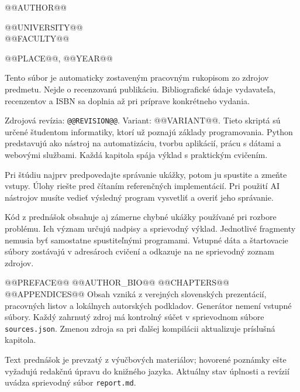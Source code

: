 \documentclass[oneside,openany,titlepage,numbers=noenddot,headinclude,
  footinclude=true,cleardoublepage=empty,BCOR=0mm,paper=a4,fontsize=11pt]{scrbook}
\begin{document}
\frenchspacing
\raggedbottom
\frontmatter
\pagestyle{plain}

\thispagestyle{empty}
\noindent{}\par
@@AUTHOR@@\par
@@UNIVERSITY@@\\@@FACULTY@@\par
@@PLACE@@, @@YEAR@@\par
\vfill
Tento súbor je automaticky zostaveným pracovným rukopisom zo zdrojov predmetu.
Nejde o recenzovanú publikáciu. Bibliografické údaje vydavateľa, recenzentov a ISBN
sa doplnia až pri príprave konkrétneho vydania.
\par\smallskip
Zdrojová revízia: \texttt{@@REVISION@@}. Variant: @@VARIANT@@.
\cleardoublepage
\pagestyle{scrheadings}
Tieto skriptá sú určené študentom informatiky, ktorí už poznajú základy programovania.
Python predstavujú ako nástroj na automatizáciu, tvorbu aplikácií, prácu s dátami
a webovými službami. Každá kapitola spája výklad s praktickým cvičením.
\par
Pri štúdiu najprv predpovedajte správanie ukážky, potom ju spustite a zmeňte vstupy.
Úlohy riešte pred čítaním referenčných implementácií. Pri použití AI nástrojov
musíte vedieť výsledný program vysvetliť a overiť jeho správanie.
\par
Kód z prednášok obsahuje aj zámerne chybné ukážky používané pri rozbore problému.
Ich význam určujú nadpisy a sprievodný výklad. Jednotlivé fragmenty nemusia byť
samostatne spustiteľnými programami. Vstupné dáta a štartovacie súbory zostávajú
v adresároch cvičení a odkazuje na ne sprievodný zoznam zdrojov.
\par
@@PREFACE@@
\cleardoublepage
@@AUTHOR_BIO@@
\tableofcontents
\mainmatter
@@CHAPTERS@@
\appendix
@@APPENDICES@@
\backmatter
\nocite{*}
\printbibliography[heading=bibintoc,title={Literatúra a dokumentácia}]
Obsah vzniká z verejných slovenských prezentácií, pracovných listov a lokálnych
autorských podkladov. Generátor nemení vstupné súbory. Každý zahrnutý zdroj má
kontrolný súčet v sprievodnom súbore \texttt{sources.json}. Zmenou zdroja sa pri
ďalšej kompilácii aktualizuje príslušná kapitola.
\par
Text prednášok je prevzatý z výučbových materiálov; hovorené poznámky ešte vyžadujú
redakčnú úpravu do knižného jazyka. Aktuálny stav úplnosti a revízií uvádza
sprievodný súbor \texttt{report.md}.
\end{document}
